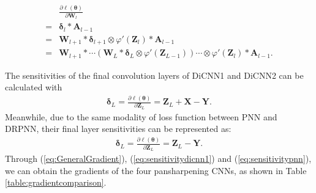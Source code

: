 \documentclass[journal]{IEEEtran}
\begin{document}
\begin{equation}
\label{eq:GeneralGradient}
\begin{split}
&\frac{\partial \ell(\pmb{\theta})}{\partial \mathbf{W}_l}\\
  =& \pmb{\delta}_l * \mathbf{A}_{l-1}\\
  =& \mathbf{W}_{l+1} * \pmb{\delta}_{l+1} \otimes \varphi'(\mathbf{Z}_l) * \mathbf{A}_{l-1}\\
=& \mathbf{W}_{l+1}* \cdots ({\mathbf{W}_{L}} * {\pmb{\delta}_{L}} \otimes \varphi'(\mathbf{Z}_{L-1}) ) \cdots \otimes \varphi'(\mathbf{Z}_l) * \mathbf{A}_{l-1}.
\end{split}
\end{equation}

The sensitivities of the final convolution layers of DiCNN1 and DiCNN2 can be calculated with
\begin{equation}
\label{eq:sensitivitydicnn1}
\begin{split}
\pmb{\delta}_{L}=\frac{\partial \ell(\pmb{\theta})}{\partial \mathbf{Z}_{L}}=\mathbf{Z}_{L} + \mathbf{X} - \mathbf{Y}.
\end{split}
\end{equation}
Meanwhile, due to the same modality of loss function between PNN and DRPNN, their final layer sensitivities can be represented as:
\begin{equation}
\label{eq:sensitivitypnn}
\begin{split}
\pmb{\delta}_{L}=\frac{\partial \ell(\pmb{\theta})}{\partial \mathbf{Z}_{L}}=\mathbf{Z}_{L}  - \mathbf{Y}.
\end{split}
\end{equation}
Through (\ref{eq:GeneralGradient}), (\ref{eq:sensitivitydicnn1}) and (\ref{eq:sensitivitypnn}), we can obtain the gradients of the four pansharpening CNNs, as shown in Table \ref{table:gradientcomparison}.
\end{document}
